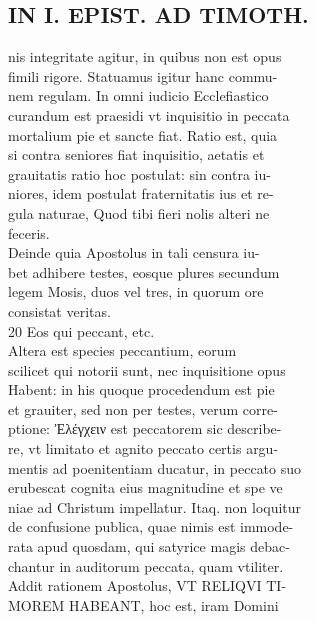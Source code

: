 \documentclass{article}
\begin{document}
\begin{pages}
\section*{IN I. EPIST. AD TIMOTH. \\
                }
nis integritate agitur, in quibus non est opus \\
                fimili rigore. Statuamus igitur hanc commu- \\
                nem regulam. In omni iudicio Ecclefiastico \\
                curandum est praesidi vt inquisitio in peccata \\
                mortalium pie et sancte fiat. Ratio est, quia \\
                si contra seniores fiat inquisitio, aetatis et \\
                grauitatis ratio hoc postulat: sin contra iu- \\
                niores, idem postulat fraternitatis ius et re- \\
                gula naturae, Quod tibi fieri nolis alteri ne \\
                feceris. \\
                Deinde quia Apostolus in tali censura iu- \\
                bet adhibere testes, eosque plures secundum \\
                legem Mosis, duos vel tres, in quorum ore \\
                consistat veritas. \\
                20 Eos qui peccant, etc. \\
                Altera est species peccantium, eorum \\
                scilicet qui notorii sunt, nec inquisitione opus \\
                Habent: in his quoque procedendum est pie \\
                et grauiter, sed non per testes, verum corre- \\
                ptione: Ἐλέγχειν est peccatorem sic describe- \\
                re, vt limitato et agnito peccato certis argu- \\
                mentis ad poenitentiam ducatur, in peccato suo \\
                erubescat cognita eius magnitudine et spe ve \\
                niae ad Christum impellatur. Itaq. non loquitur \\
                de confusione publica, quae nimis est immode- \\
                rata apud quosdam, qui satyrice magis debac- \\
                chantur in auditorum peccata, quam vtiliter. \\
                Addit rationem Apostolus, VT RELIQVI TI- \\
                MOREM HABEANT, hoc est, iram Domini \\
                

\end{pages}
\end{document}
